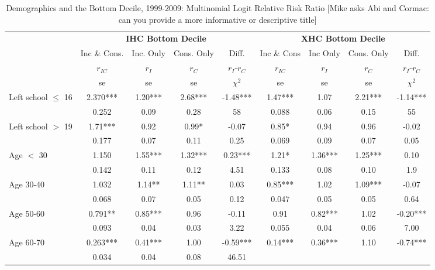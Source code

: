 \begin{table}
\caption{Demographics and the Bottom Decile, 1999-2009: Multinomial Logit Relative Risk Ratio [Mike asks Abi and Cormac: can you provide a more informative or descriptive title]}
\centering
\begin{tabular}{l|cccc|cccc}
\hline\hline
	& \multicolumn{4}{c}{\textbf{IHC Bottom Decile}} &  \multicolumn{4}{c}{\textbf{XHC Bottom Decile}} \\
	&	Inc \& Cons.	&	Inc. Only	&	Cons. Only	&	Diff.	&	Inc \& Cons	&	Inc Only	&	Cons. Only	&	Diff. 	\\
	&	$r_{IC}$	&	$r_{I}$	&	$r_{C}$ &	$r_{I}$-$r_{C}$&	$r_{IC}$	&	$r_{I}$	&	$r_{C}$	&	$r_{I}$-$r_{C}$\\
 & se & se & se & $\chi^{2}$  & se & se & se & $\chi^{2}$ \\
\hline
Left school $\leq$ 16	&	       2.370***	&	       1.20***	&	       2.68***	&	-1.48***	&	     					  1.47*** 	&	1.07	&	       2.21***	&	-1.14***	\\
                    	&	       0.252   	&	0.09	&	0.28	&	58	
		&	       0.088   	&	0.06	&	0.15	&	55	\\
Left school $>$ 19	&	       1.71***   	&	       0.92  	&	       0.99* 	&	-0.07	&
				       0.85*   	&	0.94	&	0.96	&	-0.02	\\
                    	&	       0.177   	&	0.07	&	0.11	&	0.25	&	
			      0.069   	&	0.09	&	0.07	&	0.05	\\
Age $<$ 30	&	       1.150   	&	       1.55***	&	1.32***	&	0.23***	&
			       1.21*   	&	       1.36***	&	1.25***	&	0.10	\\
                    	&	       0.142   	&	0.11	&	0.12	&	4.51	&	
			       0.133   	&	0.08	&	0.10	&	1.9	\\
Age 30-40	&	       1.032   	&	1.14**	&	       1.11** 	&	0.03	&	
			       0.85***	&	1.02	&	1.09***	&	-0.07	\\
                    	&	       0.068   	&	0.07	&	0.05	&	0.12	&	
			       0.047   	&	0.05	&	0.05	&	0.64	\\
Age 50-60	&	       0.791**  	&	       0.85*** 	&	0.96	&	-0.11	&
			       0.91   	&	       0.82***  	&	1.02	&	-0.20***	\\
                    	&	       0.093   	&	0.04	&	0.03	&	3.22	&	
			       0.055  	&	0.04	&	0.06	&	7.00	\\
Age 60-70	&	       0.263***	&	       0.41***	&	       1.00 	&	-0.59***	&	       						0.14***	&	       0.36***	&	1.10	&	-0.74***	\\
                    	&	       0.034   	&	0.04	&	0.08	&	46.51	&	

\end{tabular}
\end{table}
